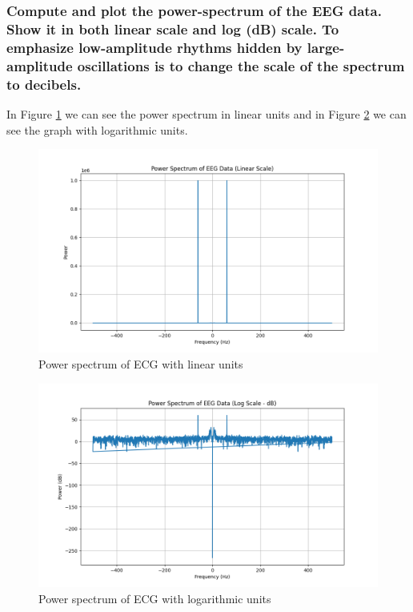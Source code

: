 \documentclass{article}
\begin{document}
\subsubsection{ Compute and plot the power-spectrum of the EEG data. Show it in both linear scale
 and log (dB) scale. To emphasize low-amplitude rhythms hidden by large-amplitude
 oscillations is to change the scale of the spectrum to decibels.}
In Figure \ref{fig:ecgpower_spectrumlinear} we can see the power spectrum in linear units and in Figure \ref{fig:ecgpower_spectrumlog} we can see the graph with logarithmic units.
  \begin{figure}[H]
    \centering \includegraphics[width=0.7\linewidth]{img/ecg2/power_spectrum_linear.png}
    \caption{Power spectrum of ECG with linear units}
    \label{fig:ecgpower_spectrumlinear}
    \end{figure}
     \begin{figure}[H]
    \centering \includegraphics[width=0.7\linewidth]{img/ecg2/power_spectrum_log.png}
    \caption{Power spectrum of ECG with logarithmic units}
    \label{fig:ecgpower_spectrumlog}
    \end{figure}
\end{document}
